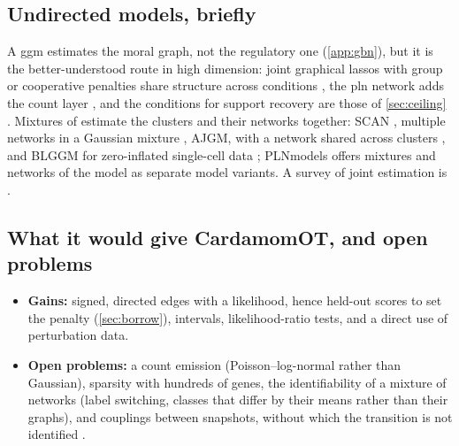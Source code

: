 \documentclass[11pt,a4paper]{article}
\begin{document}
\subsection{Undirected models, briefly}\label{app:undirected}

A \gls{ggm} estimates the moral graph, not the regulatory one (\cref{app:gbn}), but it is the better-understood
route in high dimension: joint graphical lassos with group or cooperative penalties share structure across
conditions \parencite{chiquetInferringMultipleGraphical2011,chiquetSparsitySigncoherentGroups2012}, the
\gls{pln} network adds the count layer \parencite{chiquetPoissonLognormalModelVersatile2021}, and the conditions
for support recovery are those of \cref{sec:ceiling} \parencite{chiquetContributionsSparseMethods2015}. Mixtures of  estimate the
clusters and their networks together: SCAN \parencite{haoSimultaneousClusteringEstimation2018}, multiple networks in a Gaussian
mixture \parencite{gaoEstimationMultipleNetworks2016}, AJGM, with a network shared across
clusters \parencite{yangAJGMJointLearning2025}, and BLGGM for
zero-inflated single-cell data \parencite{wuEstimatingHeterogeneousGene2022}; PLNmodels offers mixtures and networks of the  model as separate model
variants. A survey of joint estimation is \textcite{tsaiJointGaussianGraphical2022}.

\subsection{What it would give CardamomOT, and open problems}\label{app:stat-open}

\begin{itemize}
  \item \textbf{Gains:} signed, directed edges with a likelihood, hence held-out scores to set the penalty
        (\cref{sec:borrow}), intervals, likelihood-ratio tests, and a direct use of perturbation data.
  \item \textbf{Open problems:} a count emission (Poisson--log-normal rather than Gaussian), sparsity with
        hundreds of genes, the identifiability of a mixture of networks (label switching, classes that differ by
        their means rather than their graphs), and couplings between snapshots, without which the transition is
        not identified .
\end{itemize}
\end{document}

